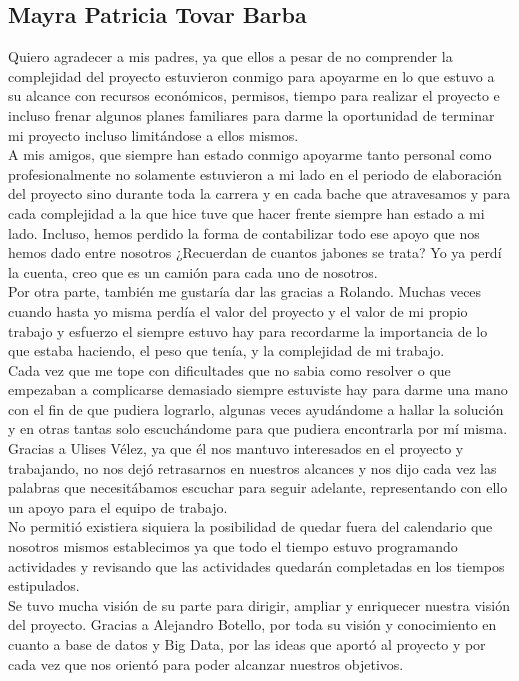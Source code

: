 \subsection{Mayra Patricia Tovar Barba}
Quiero agradecer a mis padres, ya que ellos a pesar de no comprender la complejidad del proyecto estuvieron conmigo para apoyarme en lo que estuvo a su alcance con recursos económicos, permisos, tiempo para realizar el proyecto e incluso frenar algunos planes familiares para darme la oportunidad de terminar mi proyecto incluso limitándose a ellos mismos.\\
A mis amigos, que siempre han estado conmigo apoyarme tanto personal como profesionalmente no solamente estuvieron a mi lado en el periodo de elaboración del proyecto sino durante toda la carrera y en cada bache que atravesamos y para cada complejidad a la que hice tuve que hacer frente siempre han estado a mi lado. Incluso, hemos perdido la forma de contabilizar todo ese apoyo que nos hemos dado entre nosotros ¿Recuerdan de cuantos jabones se trata? Yo ya perdí la cuenta, creo que es un camión para cada uno de nosotros. \\
Por otra parte, también me gustaría dar las gracias a Rolando. Muchas veces cuando hasta yo misma perdía el valor del proyecto y el valor de mi propio trabajo y esfuerzo el siempre estuvo hay para recordarme la importancia de lo que estaba haciendo, el peso que tenía, y la complejidad de mi trabajo.\\
Cada vez que me tope con dificultades que no sabia como resolver o que empezaban a complicarse demasiado siempre estuviste hay para darme una mano con el fin de que pudiera lograrlo, algunas veces ayudándome a hallar la solución y en otras tantas solo escuchándome para que pudiera encontrarla por mí misma.\\
Gracias a Ulises Vélez, ya que él nos mantuvo interesados en el proyecto y trabajando, no nos dejó retrasarnos en nuestros alcances y nos dijo cada vez las palabras que necesitábamos escuchar para seguir adelante, representando con ello un apoyo para el equipo de trabajo. \\
No permitió existiera siquiera la posibilidad de quedar fuera del calendario que nosotros mismos establecimos ya que todo el tiempo estuvo programando actividades y revisando que las actividades quedarán completadas en los tiempos estipulados.\\
Se tuvo mucha visión de su parte para dirigir, ampliar y enriquecer nuestra visión del proyecto.
Gracias a Alejandro Botello, por toda su visión y conocimiento en cuanto a base de datos y Big Data, por las ideas que aportó al proyecto y por cada vez que nos orientó para poder alcanzar nuestros objetivos.\\
